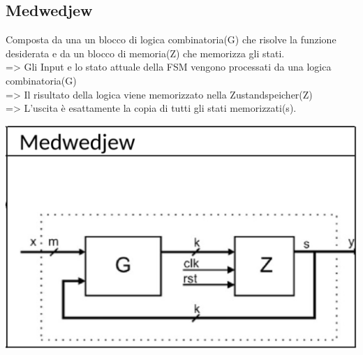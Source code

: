     \subsection{Medwedjew}
    \begin{minipage}[t]{0.48\columnwidth}
        \vspace{0pt} %
        Composta da una un blocco di logica combinatoria(G) che risolve la funzione desiderata e da un blocco di memoria(Z)
        che memorizza gli stati.\\ 
        => Gli Input e lo stato attuale della FSM vengono processati da una logica combinatoria(G)\\
        => Il risultato della logica viene memorizzato nella Zustandspeicher(Z)\\
        => L'uscita è esattamente la copia di tutti gli stati memorizzati(s).
    \end{minipage}%
    \hfill
    \begin{minipage}[t]{0.48\columnwidth}
        \vspace{0pt} %
        \includegraphics[width=\linewidth]{Images/Medwedjew.png}
    \end{minipage}

